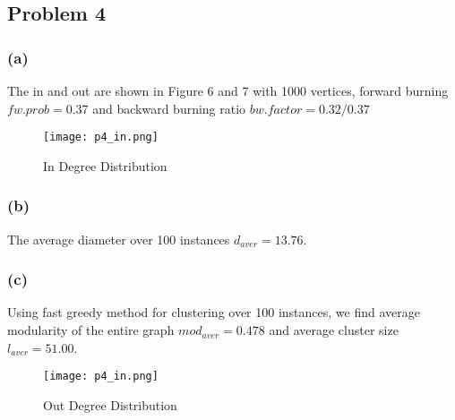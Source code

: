 \subsection*{Problem 4}
\subsubsection*{(a)}
The in and out are shown in Figure 6 and 7 with 1000 vertices, forward burning $fw.prob = 0.37$ and backward burning ratio $bw.factor = 0.32/0.37$
\begin{figure} [h]
	\centering
	\texttt{[image: p4\_in.png]}
	\caption{In Degree Distribution}
\end{figure}

\subsubsection*{(b)}
The average diameter over 100 instances $d_{aver} = 13.76$.
\subsubsection*{(c)}
Using fast greedy method for clustering over 100 instances, we find average modularity of the entire graph $ mod_{aver} = 0.478$ and average cluster size $l_{aver} = 51.00$. %
\begin{figure} [t!]
	\centering
	\texttt{[image: p4\_in.png]}
	\caption{Out Degree Distribution}
\end{figure}